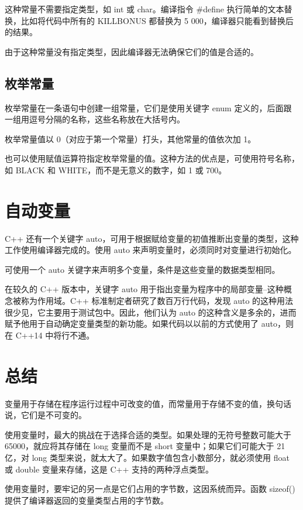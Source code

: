 这种常量不需要指定类型，如 int 或 char。编译指令 \#define 执行简单的文本替换，比如将代码中所有的 KILLBONUS 都替换为 5 000，编译器只能看到替换后的结果。

由于这种常量没有指定类型，因此编译器无法确保它们的值是合适的。
\subsection*{枚举常量}
枚举常量在一条语句中创建一组常量，它们是使用关键字 enum 定义的，后面跟一组用逗号分隔的名称，这些名称放在大括号内。

枚举常量值以 0（对应于第一个常量）打头，其他常量的值依次加 1。

也可以使用赋值运算符指定枚举常量的值。这种方法的优点是，可使用符号名称，如 BLACK 和 WHITE，而不是无意义的数字，如 1 或 700。
\section{自动变量}
C++ 还有一个关键字 auto，可用于根据赋给变量的初值推断出变量的类型，这种工作使用编译器完成的。使用 auto 来声明变量时，必须同时对变量进行初始化。

可使用一个 auto 关键字来声明多个变量，条件是这些变量的数据类型相同。
\begin{tcolorbox}[title=警告]
    在较久的 C++ 版本中，关键字 auto 用于指出变量为程序中的局部变量--这种概念被称为作用域。C++ 标准制定者研究了数百万行代码，发现 auto 的这种用法很少见，它主要用于测试包中。因此，他们认为 auto 的这种含义是多余的，进而赋予他用于自动确定变量类型的新功能。如果代码以以前的方式使用了 auto，则在 C++14 中将行不通。
\end{tcolorbox}
\section{总结}
变量用于存储在程序运行过程中可改变的值，而常量用于存储不变的值，换句话说，它们是不可变的。

使用变量时，最大的挑战在于选择合适的类型。如果处理的无符号整数可能大于 65000，就应将其存储在 long 变量而不是 short 变量中；如果它们可能大于 21 亿，对 long 类型来说，就太大了。如果数字值包含小数部分，就必须使用 float 或 double 变量来存储，这是 C++ 支持的两种浮点类型。

使用变量时，要牢记的另一点是它们占用的字节数，这因系统而异。函数 sizeof() 提供了编译器返回的变量类型占用的字节数。